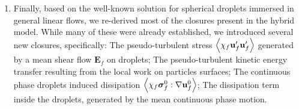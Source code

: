 \begin{enumerate}
    \item Finally, based on the well-known solution for spherical droplets immersed in general linear flows, we re-derived most of the closures present in the hybrid model. 
    While many of these were already established, we introduced several new closures, specifically: 
    The pseudo-turbulent stress $\left<\chi_f \textbf{u}_f'\textbf{u}_f'\right>$ generated by a mean shear flow $\textbf{E}_f$ on droplets; 
    The pseudo-turbulent kinetic energy transfer resulting from the local work on particles surfaces; 
    The continuous phase droplets induced dissipation $\left<\chi_f \bm\sigma_f^0:\mathbf{\nabla} \textbf{u}_f^0\right>$; 
    The dissipation term inside the droplets, generated by the mean continuous phase motion. 
\end{enumerate}